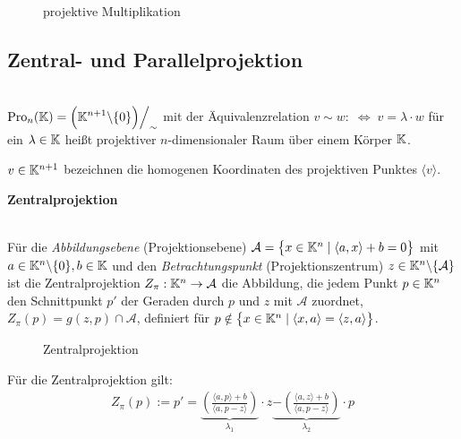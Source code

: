 \begin{description}
              \begin{figure}[ht]
                
                \caption{projektive Multiplikation}
              \end{figure}
    \end{description}

\subsection*{Zentral- und Parallelprojektion}

    \begin{defi} \ \\
        $\displaystyle{\operatorname{Pro}_n(\mathbb K) = \Big( \mathbb K^{n+1} \backslash\lbrace 0 \rbrace \Big) \Big/_\sim }$ mit der Äquivalenzrelation
        $v \sim w: \; \Leftrightarrow \; v= \lambda \cdot w$ für ein $\lambda \in \mathbb K$ heißt projektiver $n$-dimensionaler
        Raum über einem Körper $\mathbb K$. \par
        $v\in \mathbb K^{n+1}$ bezeichnen die homogenen Koordinaten des projektiven Punktes $\langle v \rangle$.
    \end{defi}


  \textbf{Zentralprojektion} \par

  \begin{defi} \ \\
    Für die \textit{Abbildungsebene} (Projektionsebene) $\mathcal{A} = \big\{ x\in \mathbb K^n \mid \langle a,x \rangle + b = 0 \big\}$
    mit $a\in \mathbb K^{n}\backslash \{0\}, b\in \mathbb K$ und den \textit{Betrachtungspunkt} (Projektionszentrum)
    $z\in \mathbb K^n\backslash\{ \mathcal{A} \}$ ist die Zentralprojektion $Z_\pi: \mathbb K^n \rightarrow \mathcal{A}$ die Abbildung, die
    jedem Punkt $p\in \mathbb K^n$ den Schnittpunkt $p'$ der Geraden durch $p$ und $z$ mit $\mathcal{A}$ zuordnet,
    $Z_\pi(p) = g(z,p) \cap \mathcal{A}$, definiert für
    $p\notin \big\{ x\in \mathbb K^n \mid \langle x,a \rangle = \langle z,a \rangle \big\}$.
  \end{defi}

  \begin{figure}[ht]
    
    \caption{Zentralprojektion}
  \end{figure}

  \begin{thm}
    Für die Zentralprojektion gilt:
    \begin{align*}
      Z_\pi(p) := p' = \underbrace{ \left( \frac{\langle a,p \rangle + b }{\langle a,p-z \rangle} \right) }_{ \lambda_1} \cdot z
                       \underbrace{-\left( \frac{\langle a,z \rangle + b }{\langle a,p-z \rangle} \right) }_{ \lambda_2} \cdot p
    \end{align*}
  \end{thm}

